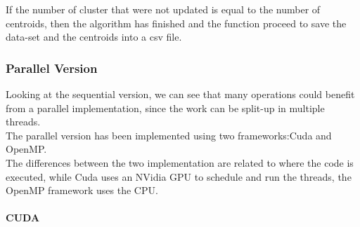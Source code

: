\documentclass[10pt,twocolumn,letterpaper]{article}
\newcommand{\nlparagraph}[1]{\paragraph{#1}\mbox{}\\}
\begin{document}
If the number of cluster that were not updated is equal to the number of centroids, then the algorithm has finished and the function
proceed to save the data-set and the centroids into a csv file.

\subsubsection{Parallel Version}
Looking at the sequential version, we can see that many operations could benefit from a parallel implementation, since the work can be 
split-up in multiple threads.\\
The parallel version has been implemented using two frameworks:Cuda and OpenMP.\\
The differences between the two implementation are related to where the code is executed, while Cuda uses an NVidia GPU to 
schedule and run the threads, the OpenMP framework uses the CPU.\\
\nlparagraph{CUDA}
\end{document}
